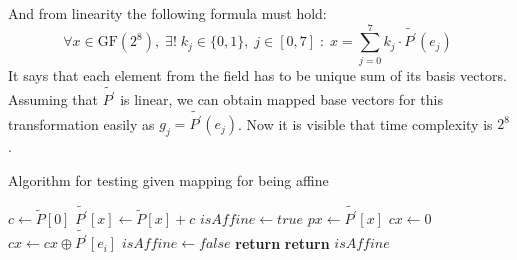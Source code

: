 \documentclass[11pt,oneside,final]{fithesis2}
\begin{document}
    And from linearity the following formula must hold:
    \begin{equation}
	\forall x \in \text{GF}(2^8), \; \exists! \; k_j \in \{0,1\}, \; j \in [0,7] \; : \; x = \sum_{j=0}^{7} k_j \cdot \widetilde{P^\prime} \left(e_j\right) \; 
    \end{equation}
    It says that each element from the field has to be unique sum of its basis vectors. Assuming that $\widetilde{P^\prime}$ is linear,
    we can obtain mapped base vectors for this transformation easily as $g_j = \widetilde{P^\prime}\left(e_j\right)$. Now it is visible that time complexity is $2^8$.
    
    \begin{algorithm}
       \caption{Algorithm for testing given mapping for being affine}
	\begin{algorithmic}[1]
	    \State $c \gets \widetilde{P}[0]$
	    \State $\widetilde{P^{\prime}}[x] \gets \widetilde{P}[x] + c$
	    \State $isAffine \gets true$
		\State $px\gets \widetilde{P^{\prime}}[x]$
		\State $cx\gets 0$
			\State $cx \gets cx \oplus \widetilde{P^{\prime}}\left[e_i\right]$
		    \EndIf
		\EndFor
		    \State $isAffine \gets false$
		    \State \textbf{return}
		\EndIf
	    \EndFor{}
	    \State \textbf{return} $isAffine$
	    \EndFunction
	\end{algorithmic}
	\label{alg:affineTest}
    \end{algorithm}

    
    
\end{document}
